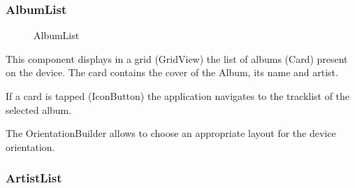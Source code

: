 \documentclass{article}
\begin{document}
\subsubsection{AlbumList}

\begin{figure}[H]
	\noindent
	\caption{AlbumList} 
\end{figure}

This component displays in a grid (GridView) the list of albums (Card) present
on the device. The card contains the cover of the Album, its name and artist.

If a card is tapped (IconButton) the application navigates to the
tracklist of the selected album.

The OrientationBuilder allows to choose an appropriate layout for the device
orientation.

\subsubsection{ArtistList}
\end{document}
